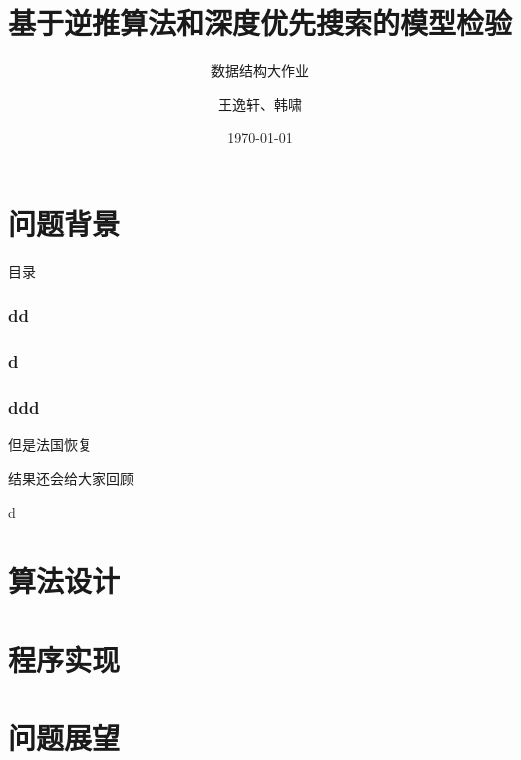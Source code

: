 \documentclass{beamer}
\title[模型检验]{基于逆推算法和深度优先搜索的模型检验}
\subtitle{数据结构大作业}
\institute{北京大学数学科学学院}
\author{王逸轩、韩啸}
\date{\today}
\begin{document}
\begin{frame}
	\titlepage
\end{frame}

\part{问题背景}
\begin{frame}
	\partpage
\end{frame}

\begin{frame}{目录}
	\tableofcontents
\end{frame}

\section{dd}
\section{d}
\section{ddd}
\begin{frame}{但是}{法国恢复}
	
	结果还会给大家回顾

d
\end{frame}

\part{算法设计}
\part{程序实现}
\part{问题展望}
\end{document}
